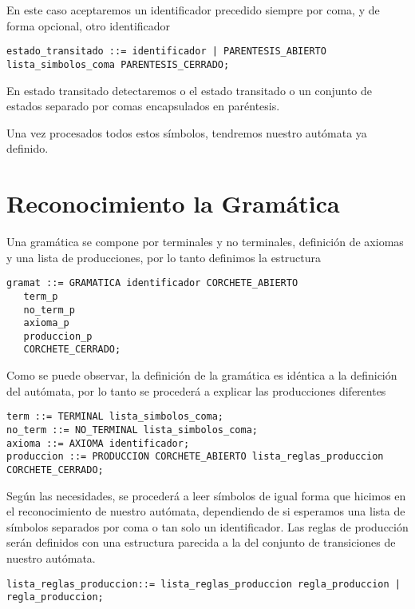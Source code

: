 \documentclass{llncs}
\begin{document}
En este caso aceptaremos un identificador precedido siempre por coma, y de forma opcional, otro identificador

\begin{verbatim}
estado_transitado ::= identificador | PARENTESIS_ABIERTO lista_simbolos_coma PARENTESIS_CERRADO;
\end{verbatim} 

En estado transitado detectaremos o el estado transitado o un conjunto de estados separado por comas encapsulados en paréntesis.

Una vez procesados todos estos símbolos, tendremos nuestro autómata ya definido.



\section{Reconocimiento la Gramática}

Una gramática se compone por terminales y no terminales, definición de axiomas y una lista de producciones, por lo tanto definimos la estructura

\begin{verbatim}
gramat ::= GRAMATICA identificador CORCHETE_ABIERTO
   term_p
   no_term_p
   axioma_p
   produccion_p
   CORCHETE_CERRADO;
\end{verbatim} 


Como se puede observar, la definición de la gramática es idéntica a la definición del autómata, por lo tanto se procederá a explicar las producciones diferentes

\begin{verbatim}
term ::= TERMINAL lista_simbolos_coma;
no_term ::= NO_TERMINAL lista_simbolos_coma;
axioma ::= AXIOMA identificador;
produccion ::= PRODUCCION CORCHETE_ABIERTO lista_reglas_produccion CORCHETE_CERRADO;
\end{verbatim} 

Según las necesidades, se procederá a leer símbolos de igual forma que hicimos en el reconocimiento de nuestro autómata, dependiendo de si esperamos una lista de símbolos separados por coma o tan solo un identificador. Las reglas de producción serán definidos con una estructura parecida a la del conjunto de transiciones de nuestro autómata.

\begin{verbatim}
lista_reglas_produccion::= lista_reglas_produccion regla_produccion | regla_produccion;
\end{verbatim} 
\end{document}
